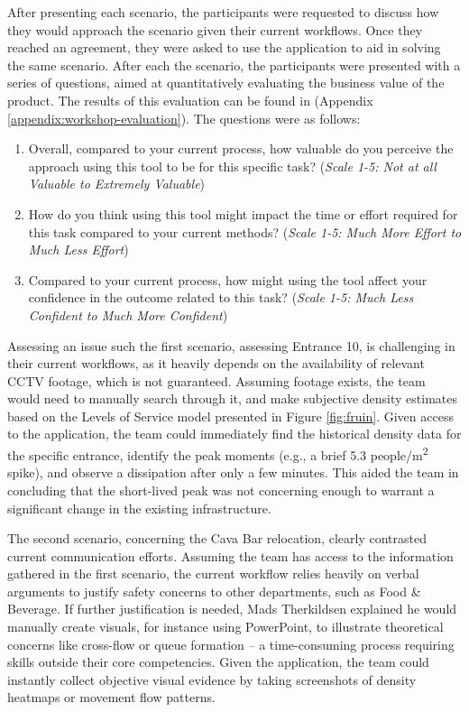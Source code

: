 After presenting each scenario, the participants were requested to discuss how they would approach the scenario given their current workflows. Once they reached an agreement, they were asked to use the application to aid in solving the same scenario. After each the scenario, the participants were presented with a series of questions, aimed at quantitatively evaluating the business value of the product. The results of this evaluation can be found in (Appendix \ref{appendix:workshop-evaluation}). The questions were as follows:

\begin{enumerate}
  \item Overall, compared to your current process, how valuable do you perceive the approach using this tool to be for this specific task? (\textit{Scale 1-5: Not at all Valuable to Extremely Valuable})
  \item How do you think using this tool might impact the time or effort required for this task compared to your current methods? (\textit{Scale 1-5: Much More Effort to Much Less Effort})
  \item Compared to your current process, how might using the tool affect your confidence in the outcome related to this task? (\textit{Scale 1-5: Much Less Confident to Much More Confident})
\end{enumerate}

Assessing an issue such the first scenario, assessing Entrance 10, is challenging in their current workflows, as it heavily depends on the availability of relevant CCTV footage, which is not guaranteed. Assuming footage exists, the team would need to manually search through it, and make subjective density estimates based on the Levels of Service model presented in Figure \ref{fig:fruin}. Given access to the application, the team could immediately find the historical density data for the specific entrance, identify the peak moments (e.g., a brief 5.3 people/m\textsuperscript{2} spike), and observe a dissipation after only a few minutes. This aided the team in concluding that the short-lived peak was not concerning enough to warrant a significant change in the existing infrastructure.

The second scenario, concerning the Cava Bar relocation, clearly contrasted current communication efforts. Assuming the team has access to the information gathered in the first scenario, the current workflow relies heavily on verbal arguments to justify safety concerns to other departments, such as Food \& Beverage. If further justification is needed, Mads Therkildsen explained he would manually create visuals, for instance using PowerPoint, to illustrate theoretical concerns like cross-flow or queue formation -- a time-consuming process requiring skills outside their core competencies. Given the application, the team could instantly collect objective visual evidence by taking screenshots of density heatmaps or movement flow patterns.

